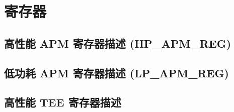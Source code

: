\documentclass[main\_\_CN.tex]{subfiles}
\begin{document}
\clearpage
\section{寄存器}

\subsection{高性能 APM 寄存器描述 (HP\_APM\_REG)}


\subsection{低功耗 APM 寄存器描述 (LP\_APM\_REG)}



\subsection{高性能 TEE 寄存器描述}

\end{document}

